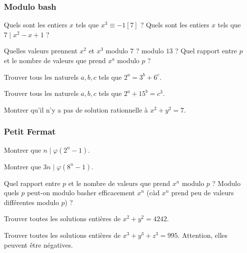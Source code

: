 \subsubsection{Modulo bash}

\begin{exo}
Quels sont les entiers $x$ tels que $x^3 \equiv -1 [7]$ ? Quels sont les entiers $x$ tels que $7\mid x^2 - x + 1$ ?
\end{exo}

\begin{exo}
Quelles valeurs prennent $x^2$ et $x^3$ modulo $7$ ? modulo $13$ ? Quel rapport entre $p$ et le nombre de valeurs que prend $x^a$ modulo $p$ ?
\end{exo}

\begin{exo}
Trouver tous les naturels $a, b, c$ tels que $2^a = 3^b + 6^c$.
\end{exo}

\begin{exo}
Trouver tous les naturels $a, b, c$ tels que $2^a + 15^b = c^3$.
\end{exo}

\begin{exo}
Montrer qu'il n'y a pas de solution rationnelle à $x^2 + y^2 = 7$.
\end{exo}

\subsubsection{Petit Fermat}

\begin{exo}
Montrer que $n \mid \varphi(2^n - 1)$.
\end{exo}

\begin{exo}
Montrer que $3n \mid \varphi(8^n - 1)$.
\end{exo}

\begin{exo}
Quel rapport entre $p$ et le nombre de valeurs que prend $x^n$ modulo $p$ ? Modulo quels $p$ peut-on modulo basher efficacement $x^n$ (càd $x^n$ prend peu de valeurs différentes modulo $p$) ?
\end{exo}

\begin{exo}
Trouver toutes les solutions entières de $x^2 + y^2 = 4242$.
\end{exo}

\begin{exo}
Trouver toutes les solutions entières de $x^3 + y^3 + z^3 = 995$. Attention, elles peuvent être négatives.
\end{exo}

